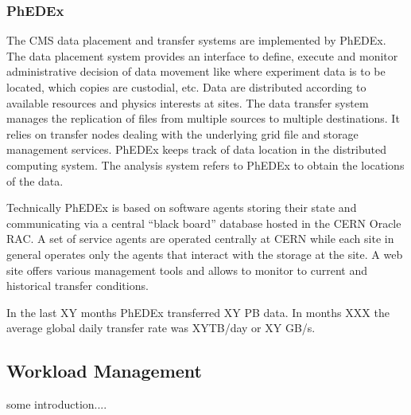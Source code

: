 \subsubsection{PhEDEx}
\label{sec:3_1_2}
The CMS data placement and transfer systems are implemented by PhEDEx\cite{RefPhEDEx}. The data placement system provides an interface to define, execute and monitor administrative decision of data movement like where experiment data is to be located, which copies are custodial, etc. 
Data are distributed according to available resources and physics interests at sites. 
The data transfer system manages the replication of files from multiple sources to multiple destinations. It relies on transfer nodes dealing with %
the underlying grid file and storage management services.
PhEDEx keeps track of data location in the distributed computing system. The analysis system refers to PhEDEx to obtain the locations of the data.

Technically PhEDEx is based on software agents storing their state and communicating via a central “black board” database hosted in the CERN Oracle RAC. A set of service agents are operated centrally at CERN while each site in general operates only the agents that interact with the storage at the site. A web site offers various management tools and allows to monitor to current and historical transfer conditions.

In the last XY months PhEDEx transferred XY PB data. In months XXX the average global daily transfer rate was XYTB/day or XY GB/s. 

\subsection{Workload Management}
some introduction....
\label{sec:3_2}
